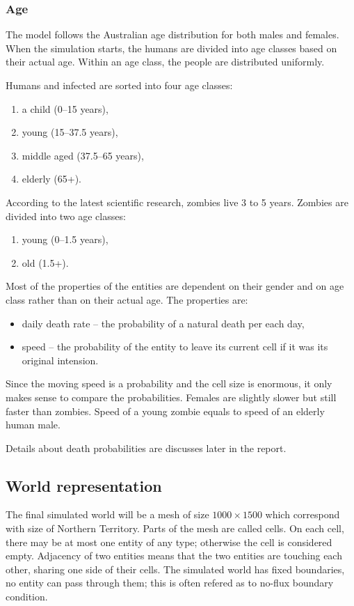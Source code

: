 \documentclass[a4paper]{article}
\begin{document}
\subsubsection{Age}

The model follows the Australian age distribution for both males and females.
When the simulation starts, the humans are divided into age classes based on their actual age.
Within an age class, the people are distributed uniformly.

Humans and infected are sorted into four age classes:
\begin{enumerate}
\item a child (0--15 years),
\item young (15--37.5 years),
\item middle aged (37.5--65 years),
\item elderly (65+).
\end{enumerate}

According to the latest scientific research, zombies live 3 to 5 years. \cite{zombiepedia}
Zombies are divided into two age classes:
\begin{enumerate}
\item young (0--1.5 years),
\item old (1.5+).
\end{enumerate}

Most of the properties of the entities are dependent on their gender and on age class rather than on their actual age.
The properties are:
\begin{itemize}
\item daily death rate -- the probability of a natural death per each day,
\item speed -- the probability of the entity to leave its current cell if it was its original intension.
\end{itemize}

Since the moving speed is a probability and the cell size is enormous, it only makes sense to compare the probabilities.
Females are slightly slower but still faster than zombies.
Speed of a young zombie equals to speed of an elderly human male.

Details about death probabilities are discusses later in the report.

\subsection{World representation}

The final simulated world will be a mesh of size $1000 \times 1500$ which correspond with size of Northern Territory. \cite{northernterritory}
Parts of the mesh are called cells.
On each cell, there may be at most one entity of any type; otherwise the cell is considered empty.
Adjacency of two entities means that the two entities are touching each other, sharing one side of their cells.
The simulated world has fixed boundaries, no entity can pass through them; this is often refered as to no-flux boundary condition.
\end{document}
